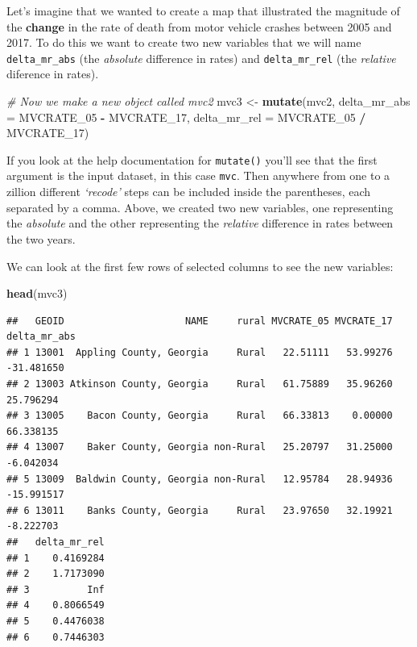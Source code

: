 \documentclass[
]{book}
\newenvironment{Shaded}{\begin{snugshade}}{\end{snugshade}}
\newcommand{\AttributeTok}[1]{\textcolor[rgb]{0.13,0.29,0.53}{#1}}
\newcommand{\CommentTok}[1]{\textcolor[rgb]{0.56,0.35,0.01}{\textit{#1}}}
\newcommand{\FunctionTok}[1]{\textcolor[rgb]{0.13,0.29,0.53}{\textbf{#1}}}
\newcommand{\NormalTok}[1]{#1}
\newcommand{\OtherTok}[1]{\textcolor[rgb]{0.56,0.35,0.01}{#1}}
\newcommand{\SpecialCharTok}[1]{\textcolor[rgb]{0.81,0.36,0.00}{\textbf{#1}}}
\begin{document}
Let's imagine that we wanted to create a map that illustrated the magnitude of the \textbf{change} in the rate of death from motor vehicle crashes between 2005 and 2017. To do this we want to create two new variables that we will name \texttt{delta\_mr\_abs} (the \emph{absolute} difference in rates) and \texttt{delta\_mr\_rel} (the \emph{relative} diference in rates).

\begin{Shaded}
\begin{Highlighting}[]
\CommentTok{\# Now we make a new object called mvc2}
\NormalTok{mvc3 }\OtherTok{\textless{}{-}} \FunctionTok{mutate}\NormalTok{(mvc2, }
               \AttributeTok{delta\_mr\_abs =}\NormalTok{ MVCRATE\_05 }\SpecialCharTok{{-}}\NormalTok{ MVCRATE\_17,}
               \AttributeTok{delta\_mr\_rel =}\NormalTok{ MVCRATE\_05 }\SpecialCharTok{/}\NormalTok{ MVCRATE\_17)}
\end{Highlighting}
\end{Shaded}

If you look at the help documentation for \texttt{mutate()} you'll see that the first argument is the input dataset, in this case \texttt{mvc}. Then anywhere from one to a zillion different \emph{`recode'} steps can be included inside the parentheses, each separated by a comma. Above, we created two new variables, one representing the \emph{absolute} and the other representing the \emph{relative} difference in rates between the two years.

We can look at the first few rows of selected columns to see the new variables:

\begin{Shaded}
\begin{Highlighting}[]
\FunctionTok{head}\NormalTok{(mvc3)}
\end{Highlighting}
\end{Shaded}

\begin{verbatim}
##   GEOID                     NAME     rural MVCRATE_05 MVCRATE_17 delta_mr_abs
## 1 13001  Appling County, Georgia     Rural   22.51111   53.99276   -31.481650
## 2 13003 Atkinson County, Georgia     Rural   61.75889   35.96260    25.796294
## 3 13005    Bacon County, Georgia     Rural   66.33813    0.00000    66.338135
## 4 13007    Baker County, Georgia non-Rural   25.20797   31.25000    -6.042034
## 5 13009  Baldwin County, Georgia non-Rural   12.95784   28.94936   -15.991517
## 6 13011    Banks County, Georgia     Rural   23.97650   32.19921    -8.222703
##   delta_mr_rel
## 1    0.4169284
## 2    1.7173090
## 3          Inf
## 4    0.8066549
## 5    0.4476038
## 6    0.7446303
\end{verbatim}
\end{document}
